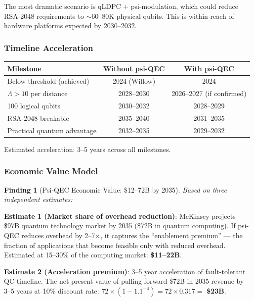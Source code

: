 \documentclass[11pt]{article}
\newtheorem{finding}[theorem]{Finding}
\theoremstyle{definition}
\theoremstyle{remark}
\begin{document}
The most dramatic scenario is qLDPC + psi-modulation, which could
reduce RSA-2048 requirements to $\sim$60--80K physical qubits. This is
within reach of hardware platforms expected by 2030--2032.

\subsubsection{Timeline Acceleration}

\begin{center}
\begin{tabular}{@{}lcc@{}}
\toprule
\textbf{Milestone} & \textbf{Without psi-QEC} & \textbf{With psi-QEC} \\
\midrule
Below threshold (achieved) & 2024 (Willow) & 2024 \\
$\Lambda > 10$ per distance & 2028--2030 & 2026--2027 (if confirmed) \\
100 logical qubits & 2030--2032 & 2028--2029 \\
RSA-2048 breakable & 2035--2040 & 2031--2035 \\
Practical quantum advantage & 2032--2035 & 2029--2032 \\
\bottomrule
\end{tabular}
\end{center}

Estimated acceleration: 3--5 years across all milestones.

\subsubsection{Economic Value Model}

\begin{finding}[Psi-QEC Economic Value: \$12--72B by 2035]
\label{thm:economic}
Based on three independent estimates:
\end{finding}

\textbf{Estimate 1 (Market share of overhead reduction)}: McKinsey
projects \$97B quantum technology market by 2035 (\$72B in quantum
computing). If psi-QEC reduces overhead by 2--7$\times$, it captures
the ``enablement premium'' --- the fraction of applications that become
feasible only with reduced overhead. Estimated at 15--30\% of the
computing market: \textbf{\$11--22B}.

\textbf{Estimate 2 (Acceleration premium)}: 3--5 year acceleration of
fault-tolerant QC timeline. The net present value of pulling forward
\$72B in 2035 revenue by 3--5 years at 10\% discount rate:
$72 \times (1 - 1.1^{-4}) = 72 \times 0.317 = $ \textbf{\$23B}.
\end{document}

